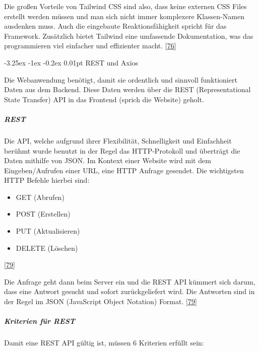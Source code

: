 \documentclass[
    headings=optiontotocandhead,%
    twoside,
    numbers=noenddot,%
    12pt, %
    titlepage, %
    parskip=full, %
    listof=leveldown, 
    numbers=noenddot, %
    a4paper,DIV=14,
    BCOR=15mm,
]{scrbook}
\makeatletter
\providecommand{\tightlist}{%
  \setlength{\itemsep}{0pt}\setlength{\parskip}{0pt}}
\renewcommand\paragraph{\@startsection{paragraph}{4}{\z@}%
    {-3.25ex \@plus -1ex \@minus -0.2ex}%
    {0.01pt}%
    {\raggedsection\normalfont\sectfont\nobreak\size@paragraph}%
  }
\makeatother
\begin{document}
Die großen Vorteile von Tailwind CSS sind also, dass keine externen CSS
Files erstellt werden müssen und man sich nicht immer komplexere
Klassen-Namen ausdenken muss. Auch die eingebaute Reaktionsfähigkeit
spricht für das Framework. Zusätzlich bietet Tailwind eine umfassende
Dokumentation, was das programmieren viel einfacher und effizienter
macht. {[}\protect\hyperlink{ref-GeeksForGeeks-TailwindCSS}{76}{]}

\hypertarget{rest-und-axios}{%
\paragraph{REST und Axios}\label{rest-und-axios}}

Die Webanwendung benötigt, damit sie ordentlich und sinnvoll
funktioniert Daten aus dem Backend. Diese Daten werden über die REST
(Representational State Transfer) API in das Frontend (sprich die
Website) geholt.

\hypertarget{rest}{%
\subparagraph{REST}\label{rest}}

Die API, welche aufgrund ihrer Flexibilität, Schnelligkeit und
Einfachheit berühmt wurde benutzt in der Regel das HTTP-Protokoll und
überträgt die Daten mithilfe von JSON. Im Kontext einer Website wird mit
dem Eingeben/Aufrufen einer URL, eine HTTP Anfrage gesendet. Die
wichtigsten HTTP Befehle hierbei sind:

\begin{itemize}
\tightlist
\item
  GET (Abrufen)
\item
  POST (Erstellen)
\item
  PUT (Aktualisieren)
\item
  DELETE (Löschen)
\end{itemize}

{[}\protect\hyperlink{ref-Talend-REST}{79}{]}

Die Anfrage geht dann beim Server ein und die REST API kümmert sich
darum, dass eine Antwort gesucht und sofort zurückgeliefert wird. Die
Antworten sind in der Regel im JSON (JavaScript Object Notation) Format.
{[}\protect\hyperlink{ref-Talend-REST}{79}{]}

\hypertarget{kriterien-fuxfcr-rest}{%
\subparagraph{Kriterien für REST}\label{kriterien-fuxfcr-rest}}

Damit eine REST API gültig ist, müssen 6 Kriterien erfüllt sein:
\end{document}
